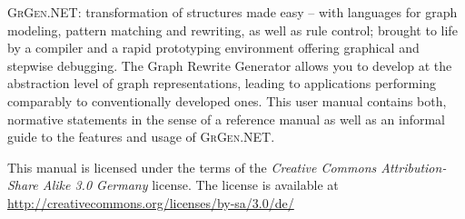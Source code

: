\documentclass[a4paper,final,11pt]{book}
\providecommand{\GrG}{{\scshape GrGen.NET}}
\newcounter{example}
\begin{document}

\noindent \textsc{GrGen.NET}: transformation of structures made easy
-- with languages for graph modeling, pattern matching and rewriting, as well as rule control;
brought to life by a compiler and a rapid prototyping environment offering graphical and stepwise debugging.
The Graph Rewrite Generator allows you to develop at the abstraction level of graph representations, leading to applications performing comparably to conventionally developed ones.
This user manual contains both, normative statements in the sense of a reference manual as well as an informal guide to the features and usage of \GrG.\\[6ex]

\vspace{13cm}

\noindent This manual is licensed under the terms of the \emph{Creative Commons Attribution-Share Alike 3.0 Germany}
license.  The license is available at
\url{http://creativecommons.org/licenses/by-sa/3.0/de/}



\clearpage

\tableofcontents























































\appendix




\printindex
\end{document}
